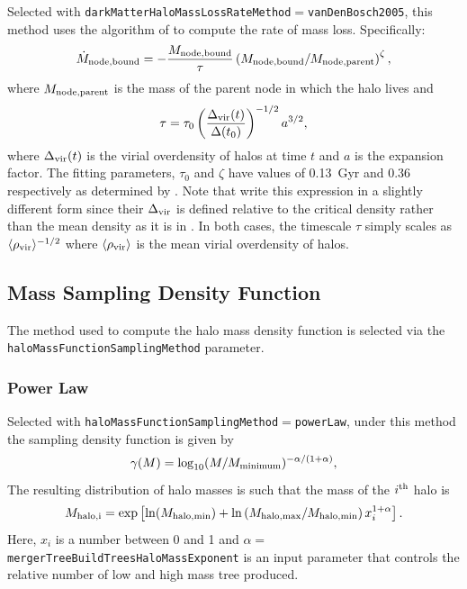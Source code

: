 Selected with {\tt darkMatterHaloMassLossRateMethod}$=${\tt vanDenBosch2005}, this method uses the algorithm of \cite{van_den_bosch_mass_2005} to compute the rate of mass loss. Specifically:
\begin{equation}
\dot{M}_{\rm node,bound} = -{M_{\rm node,bound}\over \tau} \left({M_{\rm node,bound} / M_{\rm node,parent}}\right)^\zeta,
\end{equation}
where $M_{\rm node,parent}$ is the mass of the parent \gls{node} in which the halo lives and
\begin{equation}
\tau = \tau_0 \left({\Delta_{\rm vir}(t) \over \Delta(t_0)}\right)^{-1/2} a^{3/2},
\end{equation}
where $\Delta_{\rm vir}(t)$ is the virial overdensity of halos at time $t$ and $a$ is the expansion factor. The fitting parameters, $\tau_0$ and $\zeta$ have values of 0.13~Gyr and 0.36 respectively as determined by \cite{van_den_bosch_mass_2005}. Note that  \cite{van_den_bosch_mass_2005} write this expression in a slightly different form since their $\Delta_{\rm vir}$ is defined relative to the critical density rather than the mean density as it is in \glc. In both cases, the timescale $\tau$ simply scales as $\langle \rho_{\rm vir} \rangle ^{-1/2}$ where $\langle \rho_{\rm vir} \rangle$ is the mean virial overdensity of halos.

\subsection{Mass Sampling Density Function}\label{sec:MassSamplingDensityFunction}

The method used to compute the halo mass density function is selected via the {\tt haloMassFunctionSamplingMethod} parameter.

\subsubsection{Power Law}

Selected with {\tt haloMassFunctionSamplingMethod}$=${\tt powerLaw}, under this method the sampling density function is given by
\begin{equation}
\gamma(M) = \log_{10}(M/M_{\rm minimum})^{-\alpha/(1+\alpha)},
\end{equation}
The resulting distribution of halo masses is such that the mass of the $i^{\rm th}$ halo is
\begin{equation}
 M_{\rm halo,i} = \exp\left[ \ln(M_{\rm halo,min}) + \ln\left({M_{\rm halo,max}/M_{\rm halo,min}}\right) x_i^{1+\alpha} \right].
\end{equation}
Here, $x_i$ is a number between 0 and 1 and $\alpha=${\tt mergerTreeBuildTreesHaloMassExponent} is an input parameter that controls the relative number of low and high mass tree produced.

